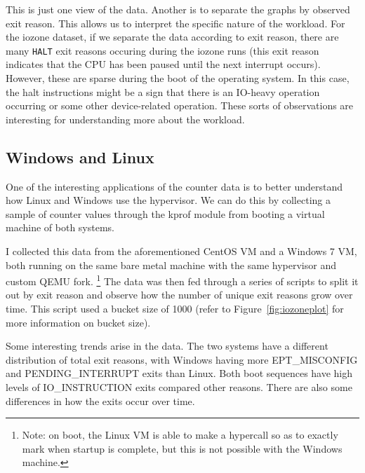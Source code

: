 \documentclass[notitlepage]{article}
\begin{document}
This is just one view of the data. Another is to separate the graphs by observed
exit reason. This allows us to interpret the specific nature of the workload.
For the iozone dataset, if we separate the data according to exit reason, there
are many \texttt{HALT} exit reasons occuring during the iozone runs (this exit
reason indicates that the CPU has been paused until the next interrupt occurs).
However, these are sparse during the boot of the operating system. In this case,
the halt instructions might be a sign that there is an IO-heavy operation
occurring or some other device-related operation. These sorts of observations
are interesting for understanding more about the workload.

\subsection{Windows and Linux}
One of the interesting applications of the counter data is to better understand
how Linux and Windows use the hypervisor. We can do this by collecting a sample
of counter values through the kprof module from booting a virtual machine of
both systems.

I collected this data from the aforementioned CentOS VM and a Windows 7 VM, both
running on the same bare metal machine with the same hypervisor and custom QEMU
fork. \footnote{Note: on boot, the Linux VM is able to make a hypercall so as to
    exactly mark when startup is complete, but this is not possible with the
Windows machine.} The data was then fed through a series of scripts to split it
out by exit reason and observe how the number of unique exit reasons grow over
time. This script used a bucket size of 1000 (refer to
Figure~\ref{fig:iozoneplot} for more information on bucket size).

Some interesting trends arise in the data. The two systems have a different
distribution of total exit reasons, with Windows having more EPT\_MISCONFIG and
PENDING\_INTERRUPT exits than Linux. Both boot sequences have high levels of
IO\_INSTRUCTION exits compared other reasons. There are also some differences in
how the exits occur over time.
\end{document}
